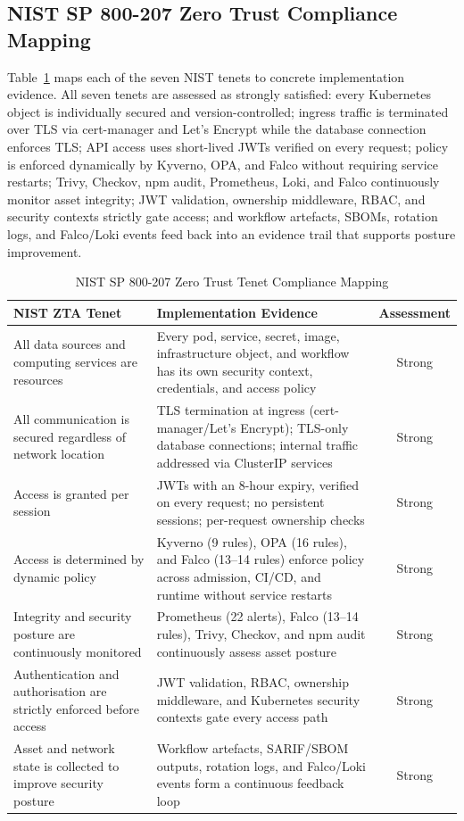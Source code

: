 \documentclass[conference]{IEEEtran}
\begin{document}
\subsection{NIST SP 800-207 Zero Trust Compliance Mapping}
Table~\ref{tab:nist} maps each of the seven NIST tenets to concrete implementation evidence. All seven tenets are assessed as strongly satisfied: every Kubernetes object is individually secured and version-controlled; ingress traffic is terminated over TLS via cert-manager and Let's Encrypt while the database connection enforces TLS; API access uses short-lived JWTs verified on every request; policy is enforced dynamically by Kyverno, OPA, and Falco without requiring service restarts; Trivy, Checkov, npm audit, Prometheus, Loki, and Falco continuously monitor asset integrity; JWT validation, ownership middleware, RBAC, and security contexts strictly gate access; and workflow artefacts, SBOMs, rotation logs, and Falco/Loki events feed back into an evidence trail that supports posture improvement.

\begin{table}[!t]
\caption{NIST SP 800-207 Zero Trust Tenet Compliance Mapping}
\label{tab:nist}
\centering
\footnotesize
\begin{tabular}{@{}p{4.3cm}p{11.5cm}c@{}}
\toprule
\textbf{NIST ZTA Tenet} & \textbf{Implementation Evidence} & \textbf{Assessment} \\
\midrule
All data sources and computing services are resources & Every pod, service, secret, image, infrastructure object, and workflow has its own security context, credentials, and access policy & Strong \\
All communication is secured regardless of network location & TLS termination at ingress (cert-manager/Let's Encrypt); TLS-only database connections; internal traffic addressed via ClusterIP services & Strong \\
Access is granted per session & JWTs with an 8-hour expiry, verified on every request; no persistent sessions; per-request ownership checks & Strong \\
Access is determined by dynamic policy & Kyverno (9 rules), OPA (16 rules), and Falco (13--14 rules) enforce policy across admission, CI/CD, and runtime without service restarts & Strong \\
Integrity and security posture are continuously monitored & Prometheus (22 alerts), Falco (13--14 rules), Trivy, Checkov, and npm audit continuously assess asset posture & Strong \\
Authentication and authorisation are strictly enforced before access & JWT validation, RBAC, ownership middleware, and Kubernetes security contexts gate every access path & Strong \\
Asset and network state is collected to improve security posture & Workflow artefacts, SARIF/SBOM outputs, rotation logs, and Falco/Loki events form a continuous feedback loop & Strong \\
\bottomrule
\end{tabular}
\end{table}
\end{document}
